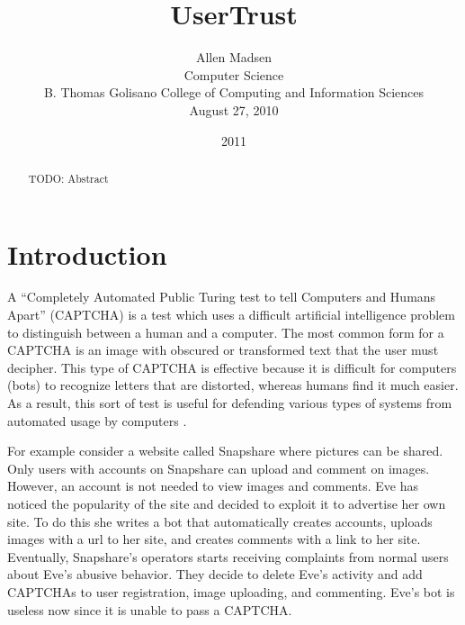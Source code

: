 \documentclass[journal, 12pt, onecolumn, draftclsnofoot]{IEEEtran}
\begin{document}
\title{\Large\bf UserTrust}
\date{2011}
\author{Allen Madsen \\ Computer Science \\ B. Thomas Golisano College of Computing and Information Sciences \\ August 27, 2010
}
\maketitle

\begin{abstract}

TODO: Abstract

\nocite{*}

\end{abstract}

\section{Introduction}
\label{Introduction}

A “Completely Automated Public Turing test to tell Computers and Humans Apart” (CAPTCHA) is a test which uses a difficult artificial intelligence problem to distinguish between a human and a computer. The most common form for a CAPTCHA is an image with obscured or transformed text that the user must decipher. This type of CAPTCHA is effective because it is difficult for computers (bots) to recognize letters that are distorted, whereas humans find it much easier. As a result, this sort of test is useful for defending various types of systems from automated usage by computers \cite{vonahn}.

For example consider a website called Snapshare where pictures can be shared. Only users with accounts on Snapshare can upload and comment on images. However, an account is not needed to view images and comments. Eve has noticed the popularity of the site and decided to exploit it to advertise her own site. To do this she writes a bot that automatically creates accounts, uploads images with a url to her site, and creates comments with a link to her site. Eventually, Snapshare's operators starts receiving complaints from normal users about Eve's abusive behavior. They decide to delete Eve's activity and add CAPTCHAs to user registration, image uploading, and commenting. Eve's bot is useless now since it is unable to pass a CAPTCHA.
\end{document}
